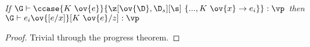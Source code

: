 \begin{lemma}
    \emph{If $\G \vdash \ccase{K~\ov{e}}{\z[\ov{\D},\D_s][\s]~\{..., K~\ov{x} \to e_i\}} : \vp$ then $\G \vdash e_i\ov{[e/x]}[K~\ov{e}/z] : \vp$}
\end{lemma}

\begin{proof}
    Trivial through the progress theorem.
\end{proof}


